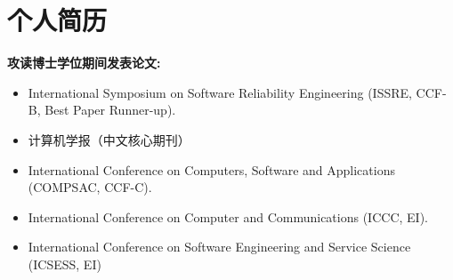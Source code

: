 
\chapter*{个人简历}

\textbf{攻读博士学位期间发表论文:}

\begin{itemize}
	\item International Symposium on Software Reliability Engineering (ISSRE, CCF-B, Best Paper
	Runner-up).
	\item 计算机学报（中文核心期刊）
	\item International Conference on Computers, Software and Applications (COMPSAC, CCF-C).
	\item International Conference on Computer and Communications (ICCC, EI).
	\item International Conference on Software Engineering and Service Science (ICSESS, EI)
\end{itemize}
